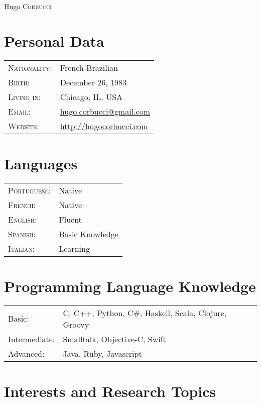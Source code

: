 \documentclass[letter,10pt]{article}
\begin{document}
\par{\centering
		{\Huge Hugo \textsc{Corbucci}
	}\bigskip\par}

      \section{Personal Data}

\begin{tabular}{p{2.5cm}l}
  \textsc{Nationality:} & French-Brazilian
  \\
  \textsc{Birth:} & December 26, 1983 \\
  \textsc{Living in:}   & Chicago, IL, USA \\
  \textsc{Email:}     &
  \href{mailto:hugo.corbucci@gmail.com}{hugo.corbucci@gmail.com}\\
  \textsc{Website:}     & \href{http://hugocorbucci.com}{http://hugocorbucci.com}
\end{tabular}

\section{Languages}
\begin{tabular}{p{2.5cm}l}
 \textsc{Portuguese:}&Native\\
 \textsc{French:}&Native\\
 \textsc{English:}&Fluent\\
 \textsc{Spanish:}&Basic Knowledge\\
 \textsc{Italian:}&Learning\\
\end{tabular}

\section{Programming Language Knowledge}
\begin{tabular}{p{2.5cm}l}
 Basic:& C, C++, Python, C\#, Haskell, Scala, Clojure, Groovy\\
 Intermediate:& Smalltalk, Objective-C, Swift\\
 Advanced:& Java, Ruby, Javascript\\
\end{tabular}

\section{Interests and Research Topics}
\end{document}
